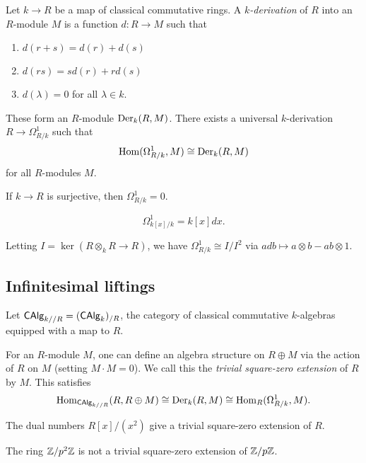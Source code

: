 \documentclass{amsart}
\begin{document}
\begin{dfn}
	Let $k \to R$ be a map of classical commutative rings.
	A \emph{$k$-derivation} of $R$ into an $R$-module $M$ is a function $d: R \to M$ such that
	\begin{enumerate}
		\item $d(r + s) = d(r) + d(s)$
		\item $d(rs) = s d(r) + r d(s)$
		\item $d(\lambda) = 0$ for all $\lambda \in k$.
	\end{enumerate}
	These form an $R$-module $\operatorname{Der}_k(R, M)$.
	There exists a universal $k$-derivation $R \to \Omega^1_{R/k}$ such that
	\[
		\operatorname{Hom}(\Omega^1_{R/k}, M) \cong \operatorname{Der}_k(R, M)
	\]
	for all $R$-modules $M$.
\end{dfn}

\begin{ex}
	If $k \to R$ is surjective, then $\Omega^1_{R/k} = 0$.
\end{ex}

\begin{ex}
	\[
		\Omega^1_{k[x]/k} = k[x] dx.
	\]
\end{ex}

\begin{ex}
	Letting $I = \ker(R \otimes_k R \to R)$, we have $\Omega^1_{R/k} \cong I / I^2$ via $a db \mapsto a \otimes b - ab \otimes 1$.
\end{ex}

\subsection{Infinitesimal liftings}

Let $\mathsf{CAlg}_{k//R} = (\mathsf{CAlg}_k)_{/R}$, the category of classical commutative $k$-algebras equipped with a map to $R$.

For an $R$-module $M$, one can define an algebra structure on $R \oplus M$ via the action of $R$ on $M$ (setting $M \cdot M = 0$).
We call this the \emph{trivial square-zero extension} of $R$ by $M$.
This satisfies
\[
	\operatorname{Hom}_{\mathsf{CAlg}_{k//R}}(R, R \oplus M) \cong \operatorname{Der}_k(R, M) \cong \operatorname{Hom}_R(\Omega^1_{R/k}, M).
\]

\begin{ex}
	The dual numbers $R[x] / (x^2)$ give a trivial square-zero extension of $R$.
\end{ex}

\begin{ex}
	The ring $\mathbb{Z} / p^2 \mathbb{Z}$ is not a trivial square-zero extension of $\mathbb{Z} / p \mathbb{Z}$.
\end{ex}
\end{document}
